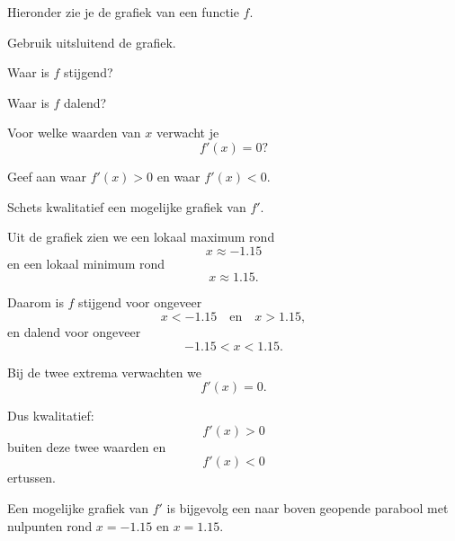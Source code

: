 \documentclass{ximera}
\begin{document}
\begin{oefening}{\oefU\ESS}

Hieronder zie je de grafiek van een functie $f$.

\begin{center}
\end{center}

Gebruik uitsluitend de grafiek.

\begin{question}
Waar is $f$ stijgend?
\end{question}

\begin{question}
Waar is $f$ dalend?
\end{question}

\begin{question}
Voor welke waarden van $x$ verwacht je
\[
f'(x)=0?
\]
\end{question}

\begin{question}
Geef aan waar $f'(x)>0$ en waar $f'(x)<0$.
\end{question}

\begin{question}
Schets kwalitatief een mogelijke grafiek van $f'$.
\end{question}

\begin{oplossing}

Uit de grafiek zien we een lokaal maximum rond
\[
x\approx -1.15
\]
en een lokaal minimum rond
\[
x\approx 1.15.
\]

Daarom is $f$ stijgend voor ongeveer
\[
x<-1.15
\quad\text{en}\quad
x>1.15,
\]
en dalend voor ongeveer
\[
-1.15<x<1.15.
\]

Bij de twee extrema verwachten we
\[
f'(x)=0.
\]

Dus kwalitatief:
\[
f'(x)>0
\]
buiten deze twee waarden en
\[
f'(x)<0
\]
ertussen.

Een mogelijke grafiek van $f'$ is bijgevolg een naar boven geopende
parabool met nulpunten rond $x=-1.15$ en $x=1.15$.

\end{oplossing}

\end{oefening}
\end{document}
